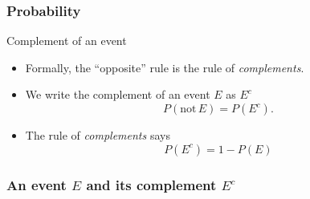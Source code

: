 \documentclass[handout]{beamer}
\begin{document}

   \begin{frame} \frametitle{Probability}

   \begin{block}
   {Complement of an event}
   \begin{itemize}
   \item Formally, the ``opposite'' rule is the rule
   of {\em complements}.
   \item We write the complement of an event $E$ as $E^c$
   $$
   P(\text{not} \, E) = P(E^c).
   $$
   \item The rule of {\em complements} says
   $$
   P(E^c) = 1 - P(E)
   $$
   \end{itemize}
   \end{block}
   \end{frame}



   \begin{frame}
   \frametitle{An event $E$ and its complement $E^c$}
   \begin{center}
   \end{center}

   \end{frame}

\end{document}
